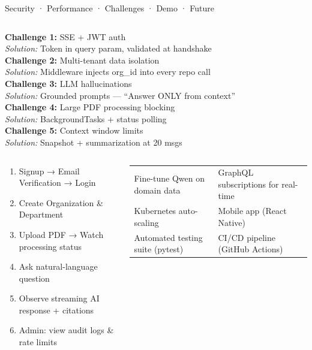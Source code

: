 \documentclass[aspectratio=169,12pt]{beamer}
\begin{document}
\begin{frame}{Security · Performance · Challenges · Demo · Future}
\begin{columns}[T]
  \begin{tcolorbox}[mybox,title={\faTools\; Challenges \& Solutions}]
    \tiny
    \textbf{Challenge 1:} SSE + JWT auth\\
    \textit{Solution:} Token in query param, validated at handshake\\[3pt]
    \textbf{Challenge 2:} Multi-tenant data isolation\\
    \textit{Solution:} Middleware injects org\_id into every repo call\\[3pt]
    \textbf{Challenge 3:} LLM hallucinations\\
    \textit{Solution:} Grounded prompts — ``Answer ONLY from context''\\[3pt]
    \textbf{Challenge 4:} Large PDF processing blocking\\
    \textit{Solution:} BackgroundTasks + status polling\\[3pt]
    \textbf{Challenge 5:} Context window limits\\
    \textit{Solution:} Snapshot + summarization at 20 msgs
  \end{tcolorbox}
\end{columns}

\vspace{4pt}
\begin{columns}[T]
  \begin{tcolorbox}[mybox,title={\faPlayCircle\; Demo Flow}]
    \tiny
    \begin{enumerate}
      \item Signup → Email Verification → Login
      \item Create Organization \& Department
      \item Upload PDF → Watch processing status
      \item Ask natural-language question
      \item Observe streaming AI response + citations
      \item Admin: view audit logs \& rate limits
    \end{enumerate}
  \end{tcolorbox}
  \begin{tcolorbox}[mybox,title={\faRocket\; Future Improvements}]
    \tiny
    \begin{tabular}{@{}p{3.8cm}p{3.8cm}@{}}
    Fine-tune Qwen on domain data & GraphQL subscriptions for real-time\\
    Kubernetes auto-scaling & Mobile app (React Native)\\
    Automated testing suite (pytest) & CI/CD pipeline (GitHub Actions)\\
    \end{tabular}
  \end{tcolorbox}
\end{columns}
\end{frame}
\end{document}
